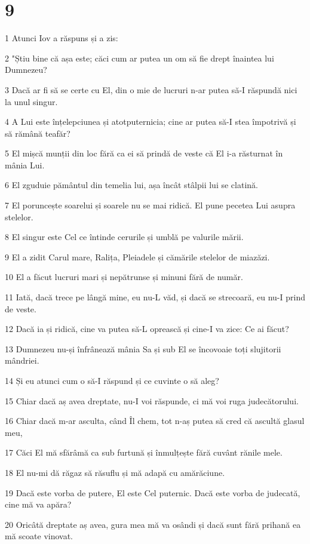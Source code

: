 \chapter{9}

\par 1 Atunci Iov a răspuns și a zis:
\par 2 "Știu bine că așa este; căci cum ar putea un om să fie drept înaintea lui Dumnezeu?
\par 3 Dacă ar fi să se certe cu El, din o mie de lucruri n-ar putea să-I răspundă nici la unul singur.
\par 4 A Lui este înțelepciunea și atotputernicia; cine ar putea să-I stea împotrivă și să rămână teafăr?
\par 5 El mișcă munții din loc fără ca ei să prindă de veste că El i-a răsturnat în mânia Lui.
\par 6 El zguduie pământul din temelia lui, așa încât stâlpii lui se clatină.
\par 7 El poruncește soarelui și soarele nu se mai ridică. El pune pecetea Lui asupra stelelor.
\par 8 El singur este Cel ce întinde cerurile și umblă pe valurile mării.
\par 9 El a zidit Carul mare, Ralița, Pleiadele și cămările stelelor de miazăzi.
\par 10 El a făcut lucruri mari și nepătrunse și minuni fără de număr.
\par 11 Iată, dacă trece pe lângă mine, eu nu-L văd, și dacă se strecoară, eu nu-I prind de veste.
\par 12 Dacă ia și ridică, cine va putea să-L oprească și cine-I va zice: Ce ai făcut?
\par 13 Dumnezeu nu-și înfrânează mânia Sa și sub El se încovoaie toți slujitorii mândriei.
\par 14 Și eu atunci cum o să-I răspund și ce cuvinte o să aleg?
\par 15 Chiar dacă aș avea dreptate, nu-I voi răspunde, ci mă voi ruga judecătorului.
\par 16 Chiar dacă m-ar asculta, când Îl chem, tot n-aș putea să cred că ascultă glasul meu,
\par 17 Căci El mă sfărâmă ca sub furtună și înmulțește fără cuvânt rănile mele.
\par 18 El nu-mi dă răgaz să răsuflu și mă adapă cu amărăciune.
\par 19 Dacă este vorba de putere, El este Cel puternic. Dacă este vorba de judecată, cine mă va apăra?
\par 20 Oricâtă dreptate aș avea, gura mea mă va osândi și dacă sunt fără prihană ea mă scoate vinovat.
